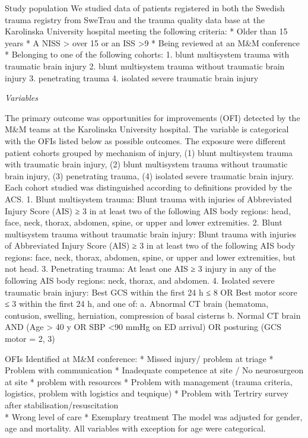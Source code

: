 \documentclass[
]{article}
\begin{document}
Study population We studied data of patients registered in both the
Swedish trauma registry from SweTrau and the trauma quality data base at
the Karolinska University hospital meeting the following criteria: *
Older than 15 years * A NISS \textgreater{} over 15 or an ISS
\textgreater9 * Being reviewed at an M\&M conference * Belonging to one
of the following cohorts: 1. blunt multisystem trauma with traumatic
brain injury 2. blunt multisystem trauma without traumatic brain injury
3. penetrating trauma 4. isolated severe traumatic brain injury

\emph{Variables}

The primary outcome was opportunities for improvements (OFI) detected by
the M\&M teams at the Karolinska University hospital. The variable is
categorical with the OFIs listed below as possible outcomes. The
exposure were different patient cohorts grouped by mechanism of injury,
(1) blunt multisystem trauma with traumatic brain injury, (2) blunt
multisystem trauma without traumatic brain injury, (3) penetrating
trauma, (4) isolated severe traumatic brain injury. Each cohort studied
was distinguished according to definitions provided by the ACS. 1. Blunt
multisystem trauma: Blunt trauma with injuries of Abbreviated Injury
Score (AIS) ≥ 3 in at least two of the following AIS body regions: head,
face, neck, thorax, abdomen, spine, or upper and lower extremities. 2.
Blunt multisystem trauma without traumatic brain injury: Blunt trauma
with injuries of Abbreviated Injury Score (AIS) ≥ 3 in at least two of
the following AIS body regions: face, neck, thorax, abdomen, spine, or
upper and lower extremities, but not head. 3. Penetrating trauma: At
least one AIS ≥ 3 injury in any of the following AIS body regions: neck,
thorax, and abdomen. 4. Isolated severe traumatic brain injury: Best GCS
within the first 24 h ≤ 8 OR Best motor score ≤ 3 within the first 24 h,
and one of: a. Abnormal CT brain (hematoma, contusion, swelling,
herniation, compression of basal cisterns b. Normal CT brain AND (Age
\textgreater{} 40 y OR SBP \textless90 mmHg on ED arrival) OR posturing
(GCS motor = 2, 3)

OFIs Identified at M\&M conference: * Missed injury/ problem at triage *
Problem with communication * Inadequate competence at site / No
neurosurgeon at site * problem with resources * Problem with management
(trauma criteria, logistics, problem with logistics and teqnique) *
Problem with Tertriry survey after stabilisation/resuscitation\\
* Wrong level of care * Exemplary treatment The model was adjusted for
gender, age and mortality. All variables with exception for age were
categorical.
\end{document}
